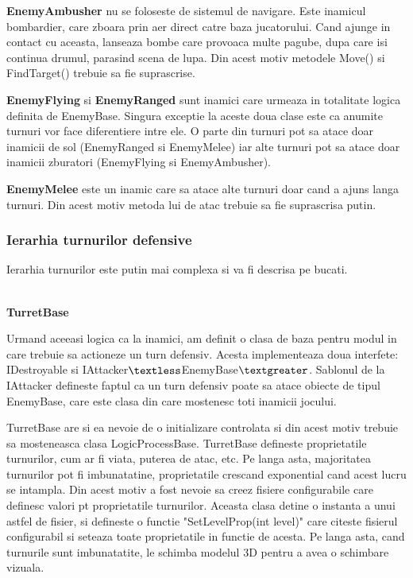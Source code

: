 \documentclass[12pt, a4paper]{article}
\begin{document}
	\textbf{EnemyAmbusher} nu se foloseste de sistemul de navigare. Este inamicul bombardier, care zboara prin aer direct catre baza jucatorului. Cand ajunge in contact cu aceasta, lanseaza bombe care provoaca multe pagube, dupa care isi continua drumul, parasind scena de lupa. Din acest motiv metodele Move() si FindTarget() trebuie sa fie suprascrise.
	
	\textbf{EnemyFlying} si \textbf{EnemyRanged} sunt inamici care urmeaza in totalitate logica definita de EnemyBase. Singura exceptie la aceste doua clase este ca anumite turnuri vor face diferentiere intre ele. O parte din turnuri pot sa atace doar inamicii de sol (EnemyRanged si EnemyMelee) iar alte turnuri pot sa atace doar inamicii zburatori (EnemyFlying si EnemyAmbusher).
	
	\textbf{EnemyMelee} este un inamic care sa atace alte turnuri doar cand a ajuns langa turnuri. Din acest motiv metoda lui de atac trebuie sa fie suprascrisa putin.
	
	\subsubsection{Ierarhia turnurilor defensive}
	
	Ierarhia turnurilor este putin mai complexa si va fi descrisa pe bucati.
	
	\ \\
	\textbf{TurretBase}
	
	Urmand aceeasi logica ca la inamici, am definit o clasa de baza pentru modul in care trebuie sa actioneze un turn defensiv. Acesta implementeaza doua interfete: IDestroyable si IAttacker$\textless$EnemyBase$\textgreater$. Sablonul de la IAttacker defineste faptul ca un turn defensiv poate sa atace obiecte de tipul EnemyBase, care este clasa din care mostenesc toti inamicii jocului.
	
	TurretBase are si ea nevoie de o initializare controlata si din acest motiv trebuie sa mosteneasca clasa LogicProcessBase. TurretBase defineste proprietatile turnurilor, cum ar fi viata, puterea de atac, etc. Pe langa asta, majoritatea turnurilor pot fi imbunatatine, proprietatile crescand exponential cand acest lucru se intampla. Din acest motiv a fost nevoie sa creez fisiere configurabile care definesc valori pt proprietatile turnurilor. Aceasta clasa detine o instanta a unui astfel de fisier, si defineste o functie "SetLevelProp(int level)" care citeste fisierul configurabil si seteaza toate proprietatile in functie de acesta. Pe langa asta, cand turnurile sunt imbunatatite, le schimba modelul 3D pentru a avea o schimbare vizuala.
	
\end{document}
